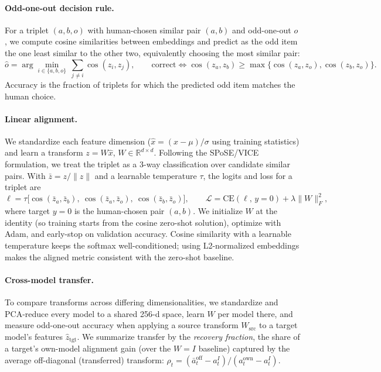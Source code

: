 \documentclass{article}
\begin{document}
\paragraph{Odd-one-out decision rule.} For a triplet $(a,b,o)$ with human-chosen
similar pair $(a,b)$ and odd-one-out $o$, we compute cosine similarities between
embeddings and predict as the odd item the one least similar to the other two,
equivalently choosing the most similar pair:
\begin{equation}
\hat{o} = \arg\min_{i\in\{a,b,o\}}\ \textstyle\sum_{j\neq i}\cos(z_i,z_j),
\qquad
\text{correct} \iff \cos(z_a,z_b) \ge \max\{\cos(z_a,z_o),\cos(z_b,z_o)\}.
\end{equation}
Accuracy is the fraction of triplets for which the predicted odd item matches the
human choice.

\paragraph{Linear alignment.} We standardize each feature dimension
($\hat{x} = (x-\mu)/\sigma$ using training statistics) and learn a transform
$z = W\hat{x}$, $W\in\mathbb{R}^{d\times d}$. Following the SPoSE/VICE
formulation, we treat the triplet as a 3-way classification over candidate
similar pairs. With $\bar z = z/\lVert z\rVert$ and a learnable temperature
$\tau$, the logits and loss for a triplet are
\begin{equation}
\ell = \tau \big[\cos(\bar z_a,\bar z_b),\ \cos(\bar z_a,\bar z_o),\ \cos(\bar z_b,\bar z_o)\big],
\qquad
\mathcal{L} = \mathrm{CE}\!\left(\ell,\, y{=}0\right) + \lambda\lVert W\rVert_F^2,
\end{equation}
where target $y{=}0$ is the human-chosen pair $(a,b)$. We initialize $W$ at the
identity (so training starts from the cosine zero-shot solution), optimize with
Adam, and early-stop on validation accuracy. Cosine similarity with a learnable
temperature keeps the softmax well-conditioned; using L2-normalized embeddings
makes the aligned metric consistent with the zero-shot baseline.

\paragraph{Cross-model transfer.} To compare transforms across differing
dimensionalities, we standardize and PCA-reduce every model to a shared 256-d
space, learn $W$ per model there, and measure odd-one-out accuracy when applying a
source transform $W_{\text{src}}$ to a target model's features
$\hat z_{\text{tgt}}$. We summarize transfer by the \emph{recovery fraction},
the share of a target's own-model alignment gain (over the $W{=}I$ baseline)
captured by the average off-diagonal (transferred) transform:
$\rho_t = (\bar a^{\text{off}}_t - a^{I}_t)/(a^{\text{own}}_t - a^{I}_t)$.
\end{document}
